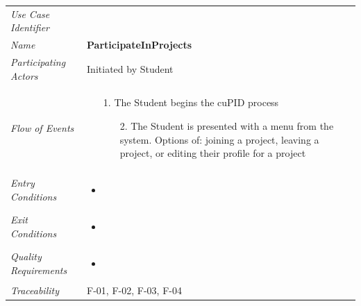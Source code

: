 \documentclass[12pt,letterpaper]{article}
\begin{document}
\begin{center}
	\begin{tabu} to 
		\toprule
		Use Case Identifier & \participateinprojects{} \\
		Name & {\bf ParticipateInProjects} \\
		Participating Actors & Initiated by Student \\

		Flow of Events & 
	    \begin{enumerate}[topsep=-1em]
		    \item[1.] The Student begins the cuPID process
			\begin{enumerate}
				\item[2.] The Student is presented with a menu from the system. Options of: joining a project, leaving a project, or editing their profile for a project
			\end{enumerate}

		\end{enumerate} \\

		Entry Conditions &
		\begin{itemize}[topsep=-1em]
			\item  
        \end{itemize} \\

		Exit Conditions &
		\begin{itemize}[topsep=-1em]
			\item 
        \end{itemize} \\

		Quality Requirements &
		\begin{itemize}[topsep=-1em]
			\item 
        \end{itemize} \\

		Traceability & F-01, F-02, F-03, F-04\\

		\toprule
	\end{tabu}
\end{center}
\end{document}
